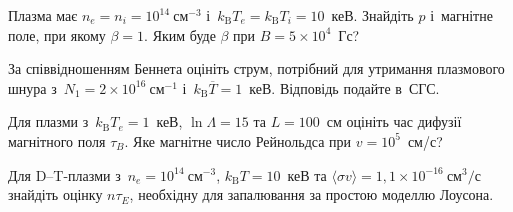 \begin{problem}\label{prb:PlasmaBeta}
	Плазма має $n_e=n_i=10^{14}~\mathrm{см}^{-3}$ і~$k_{\mathrm B}T_e=k_{\mathrm
				B}T_i=10$~кеВ. Знайдіть $p$ і~магнітне поле, при якому $\beta=1$. Яким буде $\beta$ при
	$B=5\times10^4$~Гс?
\end{problem}

\begin{problem}\label{prb:PlasmaBennett}
	За співвідношенням Беннета оцініть струм, потрібний для утримання плазмового шнура
	з~$N_1=2\times10^{16}~\mathrm{см}^{-1}$ і~$k_{\mathrm B}\overline T=1$~кеВ. Відповідь
	подайте в~СГС.
\end{problem}

\begin{problem}\label{prb:PlasmaDiffusion}
	Для плазми з~$k_{\mathrm B}T_e=1$~кеВ, $\ln\Lambda=15$ та $L=100$~см оцініть час дифузії
	магнітного поля $\tau_B$. Яке магнітне число Рейнольдса при $v=10^5$~см/с?
\end{problem}

\begin{problem}\label{prb:PlasmaFusion}
	Для D--T-плазми з~$n_e=10^{14}~\mathrm{см}^{-3}$, $k_{\mathrm B}T=10$~кеВ та
	$\langle\sigma v\rangle=1{,}1\times10^{-16}~\mathrm{см}^3/\mathrm{с}$ знайдіть оцінку
	$n\tau_E$, необхідну для запалювання за простою моделлю Лоусона.
\end{problem}

